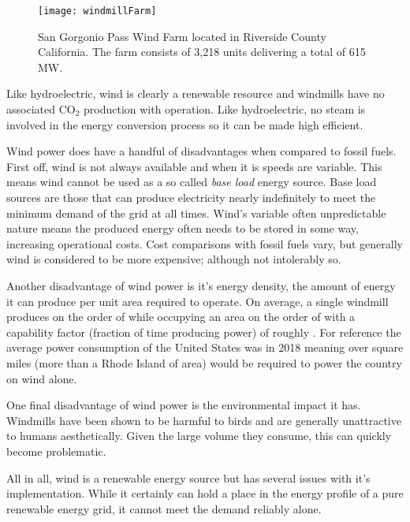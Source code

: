 		\begin{figure}[h!]
			\centering
			\texttt{[image: windmillFarm]}
			\caption[San Gorgonio Pass Wind Farm]{San Gorgonio Pass Wind Farm located in Riverside County California. The farm consists of 3,218 units delivering a total of 615 MW. \cite{bibid} }
		\end{figure}
	
		Like hydroelectric, wind is clearly a renewable resource and windmills have no associated CO$_2$ production with operation. \cite{bibid} Like hydroelectric, no steam is involved in the energy conversion process so it can be made high efficient. \cite{bibid}
		
		Wind power does have a handful of disadvantages when compared to fossil fuels. First off, wind is not always available and when it is speeds are variable. This means wind cannot be used as a so called \emph{base load} energy source.\cite{bibid} Base load sources are those that can produce electricity nearly indefinitely to meet the minimum demand of the grid at all times. \cite{bibid} Wind's variable often unpredictable nature means the produced energy often needs to be stored in some way, increasing operational costs. \cite{bibid} Cost comparisons with fossil fuels vary, but generally wind is considered to be more expensive; although not intolerably so. \cite{bibid}
		
		Another disadvantage of wind power is it's energy density, the amount of energy it can produce per unit area required to operate. On average, a single windmill produces on the order of  while occupying an area on the order of  with a capability factor (fraction of time producing power) of roughly . \cite{bibid} For reference the average power consumption of the United States was  in 2018 \cite{bibid} meaning over  square miles (more than a Rhode Island of area) would be required to power the country on wind alone. 
		
		One final disadvantage of wind power is the environmental impact it has. Windmills have been shown to be harmful to birds \cite{bibid} and are generally unattractive to humans aesthetically. \cite{bibid} Given the large volume they consume, this can quickly become problematic. 
		
		All in all, wind is a renewable energy source but has several issues with it's implementation. While it certainly can hold a place in the energy profile of a pure renewable energy grid, it cannot meet the demand reliably alone.
		
